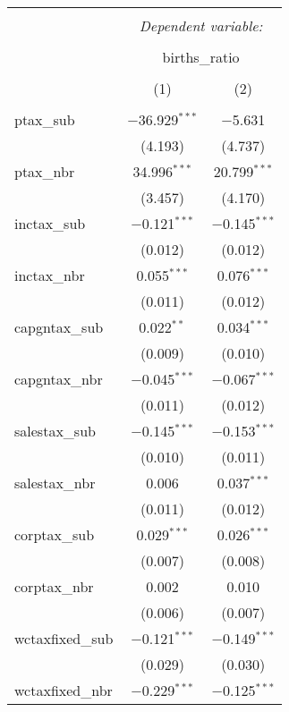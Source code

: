 
\begin{table}[!htbp] \centering 
  \caption{} 
  \label{} 
\begin{tabular}{@{\extracolsep{5pt}}lcc} 
\\[-1.8ex]\hline 
\hline \\[-1.8ex] 
 & \multicolumn{2}{c}{\textit{Dependent variable:}} \\ 
\cline{2-3} 
\\[-1.8ex] & \multicolumn{2}{c}{births\_ratio} \\ 
\\[-1.8ex] & (1) & (2)\\ 
\hline \\[-1.8ex] 
 ptax\_sub & $-$36.929$^{***}$ & $-$5.631 \\ 
  & (4.193) & (4.737) \\ 
  ptax\_nbr & 34.996$^{***}$ & 20.799$^{***}$ \\ 
  & (3.457) & (4.170) \\ 
  inctax\_sub & $-$0.121$^{***}$ & $-$0.145$^{***}$ \\ 
  & (0.012) & (0.012) \\ 
  inctax\_nbr & 0.055$^{***}$ & 0.076$^{***}$ \\ 
  & (0.011) & (0.012) \\ 
  capgntax\_sub & 0.022$^{**}$ & 0.034$^{***}$ \\ 
  & (0.009) & (0.010) \\ 
  capgntax\_nbr & $-$0.045$^{***}$ & $-$0.067$^{***}$ \\ 
  & (0.011) & (0.012) \\ 
  salestax\_sub & $-$0.145$^{***}$ & $-$0.153$^{***}$ \\ 
  & (0.010) & (0.011) \\ 
  salestax\_nbr & 0.006 & 0.037$^{***}$ \\ 
  & (0.011) & (0.012) \\ 
  corptax\_sub & 0.029$^{***}$ & 0.026$^{***}$ \\ 
  & (0.007) & (0.008) \\ 
  corptax\_nbr & 0.002 & 0.010 \\ 
  & (0.006) & (0.007) \\ 
  wctaxfixed\_sub & $-$0.121$^{***}$ & $-$0.149$^{***}$ \\ 
  & (0.029) & (0.030) \\ 
  wctaxfixed\_nbr & $-$0.229$^{***}$ & $-$0.125$^{***}$ \\ 

\end{tabular}
\end{table}
